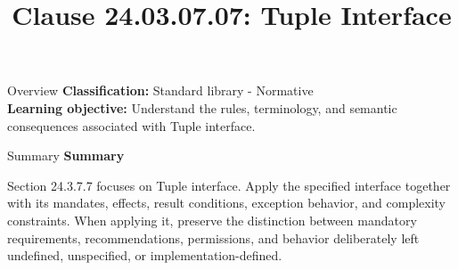 \documentclass[10pt,letterpaper]{article}
\title{Clause 24.03.07.07: Tuple Interface}
\author{}
\date{}
\begin{document}
\maketitle
\begin{CornellOverviewBox}{Overview}
\textbf{Classification:} Standard library - Normative\\[2pt]
\textbf{Learning objective:} Understand the rules, terminology, and semantic consequences associated with Tuple interface.
\end{CornellOverviewBox}\begin{CornellSummaryBox}{Summary}
{\sffamily\bfseries\color{Accent} Summary}\par\vspace{3pt}Section 24.3.7.7 focuses on Tuple interface. Apply the specified interface together with its mandates, effects, result conditions, exception behavior, and complexity constraints. When applying it, preserve the distinction between mandatory requirements, recommendations, permissions, and behavior deliberately left undefined, unspecified, or implementation-defined.
\end{CornellSummaryBox}
\end{document}
